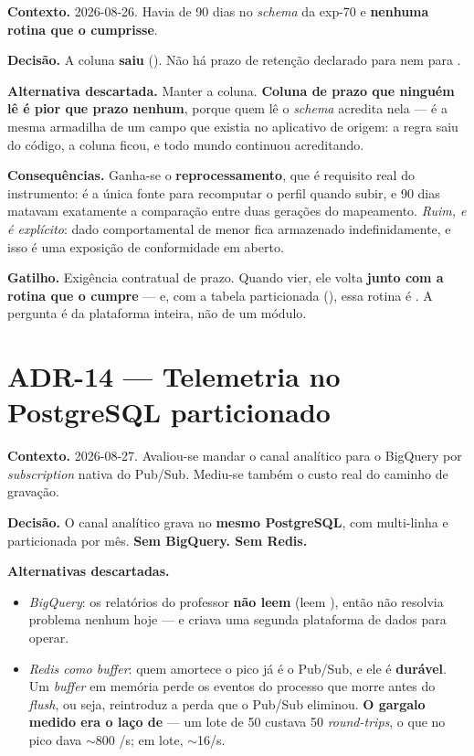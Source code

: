 \textbf{Contexto.} 2026-08-26. Havia  de 90 dias no \emph{schema}
da exp-70 e \textbf{nenhuma rotina que o cumprisse}.

\textbf{Decisão.} A coluna \textbf{saiu}
(). Não há prazo de retenção declarado para
 nem para .

\textbf{Alternativa descartada.} Manter a coluna. \textbf{Coluna de prazo que
ninguém lê é pior que prazo nenhum}, porque quem lê o \emph{schema} acredita nela
--- é a mesma armadilha de um campo  que existia no
aplicativo de origem: a regra saiu do código, a coluna ficou, e todo mundo
continuou acreditando.

\textbf{Consequências.} Ganha-se o \textbf{reprocessamento}, que é requisito real
do instrumento:  é a única fonte para recomputar o perfil quando
 subir, e 90 dias matavam exatamente a comparação entre
duas gerações do mapeamento. \emph{Ruim, e é explícito}: dado comportamental de
menor fica armazenado indefinidamente, e isso é uma exposição de conformidade em
aberto.

\textbf{Gatilho.} Exigência contratual de prazo. Quando vier, ele volta
\textbf{junto com a rotina que o cumpre} --- e, com a tabela particionada
(), essa rotina é . A pergunta é da
plataforma inteira, não de um módulo.

\section{ADR-14 --- Telemetria no PostgreSQL particionado}

\textbf{Contexto.} 2026-08-27. Avaliou-se mandar o canal analítico para o BigQuery
por \emph{subscription} nativa do Pub/Sub. Mediu-se também o custo real do
caminho de gravação.

\textbf{Decisão.} O canal analítico grava no \textbf{mesmo PostgreSQL}, com
 multi-linha e  particionada por mês.
\textbf{Sem BigQuery. Sem Redis.}

\textbf{Alternativas descartadas.}
\begin{itemize}
  \item \emph{BigQuery}: os relatórios do professor \textbf{não leem}
     (leem ), então não resolvia
    problema nenhum hoje --- e criava uma segunda plataforma de dados para
    operar.
  \item \emph{Redis como \emph{buffer}}: quem amortece o pico já é o Pub/Sub, e
    ele é \textbf{durável}. Um \emph{buffer} em memória perde os eventos do
    processo que morre antes do \emph{flush}, ou seja, reintroduz a perda que o
    Pub/Sub eliminou. \textbf{O gargalo medido era o laço de } --- um
    lote de 50 custava 50 \emph{round-trips}, o que no pico dava
    $\sim$800 /s; em lote, $\sim$16/s.
\end{itemize}

